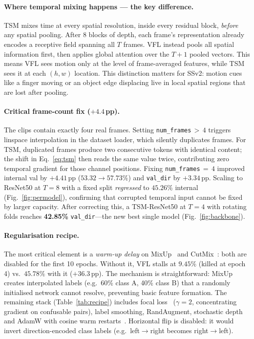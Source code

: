 \documentclass[10pt,twocolumn,letterpaper]{article}
\begin{document}
\paragraph{Where temporal mixing happens --- the key difference.}
TSM mixes time at every spatial resolution, inside every residual block,
\emph{before} any spatial pooling. After 8 blocks of depth, each frame's
representation already encodes a receptive field spanning all $T$ frames.
VFL instead pools all spatial information first, then applies global attention
over the $T{+}1$ pooled vectors. This means VFL sees motion only at the
level of frame-averaged features, while TSM sees it at each $(h, w)$ location.
This distinction matters for SSv2: motion cues like a finger moving or an
object edge displacing live in local spatial regions that are lost after pooling.

\paragraph{Critical frame-count fix ($+4.4$\,pp).}
The clips contain exactly four real frames. Setting \texttt{num\_frames}$\,{>}\,4$
triggers linspace interpolation in the dataset loader, which silently duplicates
frames. For TSM, duplicated frames produce two consecutive tokens with identical
content; the shift in Eq.~\eqref{eq:tsm} then reads the same value twice,
contributing zero temporal gradient for those channel positions.
Fixing \texttt{num\_frames}$\,{=}\,4$ improved internal val by $+4.41$\,pp
($53.32{\rightarrow}57.73\%$) and \texttt{val\_dir} by $+3.34$\,pp.
Scaling to ResNet50 at $T{=}8$ with a fixed split \emph{regressed} to
$45.26\%$ internal (Fig.~\ref{fig:permodel}), confirming that corrupted
temporal input cannot be fixed by larger capacity.
After correcting this, a TSM-ResNet50 at $T{=}4$ with rotating folds reaches
\textbf{42.85\%} \texttt{val\_dir}---the new best single model (Fig.~\ref{fig:backbone}).

\paragraph{Regularisation recipe.}
The most critical element is a \emph{warm-up delay} on MixUp~\cite{zhang2018mixup}
and CutMix~\cite{yun2019cutmix}: both are disabled for the first 10 epochs.
Without it, VFL stalls at $9.45\%$ (killed at epoch 4) vs.\ $45.78\%$ with it
($+36.3$\,pp). The mechanism is straightforward: MixUp creates interpolated labels
(e.g.\ 60\% class A, 40\% class B) that a randomly initialised network cannot
resolve, preventing basic feature formation. The remaining stack (Table~\ref{tab:recipe})
includes focal loss~\cite{lin2017focal} ($\gamma{=}2$, concentrating gradient on
confusable pairs), label smoothing, RandAugment, stochastic depth and AdamW with
cosine warm restarts~\cite{loshchilov2017sgdr}. Horizontal flip is disabled:
it would invert direction-encoded class labels (e.g.\ left$\rightarrow$right
becomes right$\rightarrow$left).
\end{document}
